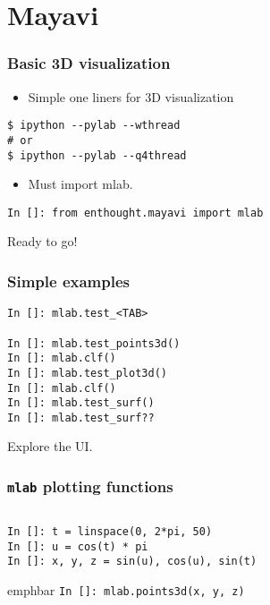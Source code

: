 \documentclass[14pt,compress]{beamer}
\newcommand{\emphbar}[1]
{\begin{beamercolorbox}[rounded=true]{emphbar} 
      {#1}
 \end{beamercolorbox}
}
\newcommand{\typ}[1]{\lstinline{#1}}
\newcommand{\myemph}[1]{\structure{\emph{#1}}}
\newcommand{\PythonCode}[1]{\lstinline{#1}}
\begin{document}
\section{Mayavi}

\begin{frame}[fragile]
\frametitle{Basic 3D visualization}
\begin{itemize}
    \item Simple one liners for 3D visualization
\end{itemize}
  \begin{lstlisting}
$ ipython --pylab --wthread
# or
$ ipython --pylab --q4thread
  \end{lstlisting}
\begin{itemize}
    \item Must import mlab.
\end{itemize}
\begin{lstlisting}
In []: from enthought.mayavi import mlab
\end{lstlisting}
Ready to go!
\end{frame}

\begin{frame}[fragile]
    \frametitle{Simple examples}

    \myemph{\Large Try these}

    \begin{lstlisting}
In []: mlab.test_<TAB>

In []: mlab.test_points3d()
In []: mlab.clf()
In []: mlab.test_plot3d()
In []: mlab.clf()
In []: mlab.test_surf()
In []: mlab.test_surf??
    \end{lstlisting}
Explore the UI.
\end{frame}


\begin{frame}[fragile]
    \frametitle{\typ{mlab} plotting functions}
    \begin{columns}
        \myemph{\Large 0D data}
    \end{columns}

    \begin{lstlisting}
In []: t = linspace(0, 2*pi, 50)
In []: u = cos(t) * pi
In []: x, y, z = sin(u), cos(u), sin(t)
    \end{lstlisting}
    \emphbar{\PythonCode{In []: mlab.points3d(x, y, z)}}
\end{frame}
\end{document}
